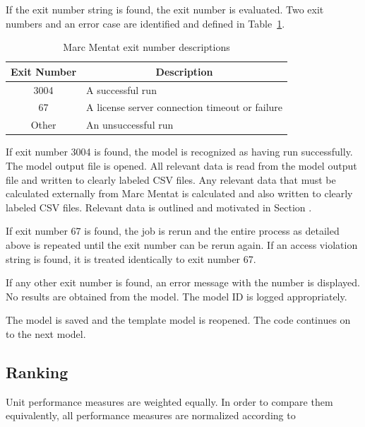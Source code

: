 If the exit number string is found, the exit number is evaluated. Two exit numbers and an error case are identified and defined in Table~\ref{tab:exno}.

\begin{table}[H]
\centering
\begin{tabular}{@{}cl@{}}
\toprule
\textbf{Exit Number} & \multicolumn{1}{c}{\textbf{Description}}       \\ \midrule
3004                 & A successful run                               \\
67                   & A license server connection timeout or failure \\
Other                & An unsuccessful run                            \\ \bottomrule
\end{tabular}
\caption{Marc Mentat exit number descriptions}
\label{tab:exno}
\end{table}

If exit number 3004 is found, the model is recognized as having run successfully. The model output file is opened. All relevant data is read from the model output file and written to clearly labeled CSV files. Any relevant data that must be calculated externally from Marc Mentat is calculated and also written to clearly labeled CSV files. Relevant data is outlined and motivated in Section .

If exit number 67 is found, the job is rerun and the entire process as detailed above is repeated until the exit number can be rerun again. If an access violation string is found, it is treated identically to exit number 67.

If any other exit number is found, an error message with the number is displayed. No results are obtained from the model. The model ID is logged appropriately.

The model is saved and the template model is reopened. The code continues on to the next model.

\subsection{Ranking}
\label{ssec:rank}

Unit performance measures are weighted equally. In order to compare them equivalently, all performance measures are normalized according to

